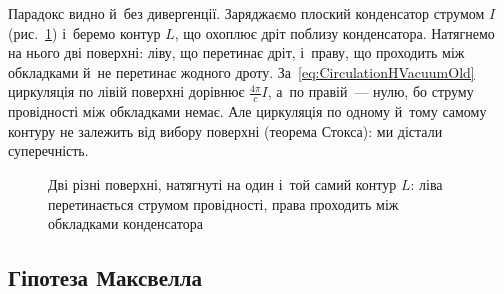 Парадокс видно й~без дивергенції. Заряджаємо плоский конденсатор струмом $I$ (рис.~\ref{pic:TwoSurfaces}) і~беремо контур $L$, що охоплює дріт поблизу конденсатора. Натягнемо на нього дві поверхні: ліву, що перетинає дріт, і~праву, що проходить між обкладками й~не перетинає жодного дроту. За~\eqref{eq:CirculationHVacuumOld} циркуляція по лівій поверхні дорівнює $\frac{4\pi}{c}I$, а~по правій~--- нулю, бо струму провідності між обкладками немає. Але циркуляція по одному й~тому самому контуру не залежить від вибору поверхні (теорема Стокса): ми дістали суперечність.

\begin{figure}[htbp]\centering
	\caption{Дві різні поверхні, натягнуті на один і~той самий контур $L$: ліва перетинається струмом провідності, права проходить між обкладками конденсатора\label{pic:TwoSurfaces}}
\end{figure}


\subsection*{Гіпотеза Максвелла}


